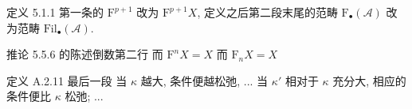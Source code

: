 \documentclass{AJerrata}
\begin{document}
\begin{Errata}
		\item[定义 5.1.1]
		第一条的 $\mathrm{F}^{p+1}$ 改为 $\mathrm{F}^{p+1} X$, 定义之后第二段末尾的范畴 $\mathrm{F}_{\bullet}(\mathcal{A})$ 改为范畴 $\mathrm{Fil}_{\bullet}(\mathcal{A})$.
		
		\item[推论 5.5.6 的陈述倒数第二行]
		\Orig 而 $\mathrm{F}^n X = X$
		\Corr 而 $\mathrm{F}_n X = X$
		
		\item[定义 A.2.11 最后一段]
		\Orig 当 $\kappa$ 越大, 条件便越松弛, ...
		\Corr 当 $\kappa'$ 相对于 $\kappa$ 充分大, 相应的条件便比 $\kappa$ 松弛; ...
	\end{Errata}
\end{document}
